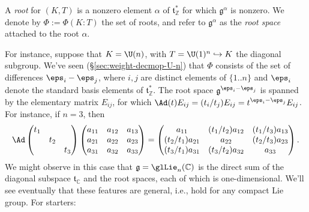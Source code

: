 \documentclass[reqno]{amsart} 
\begin{document}
\begin{definition}
  A \emph{root} for $(K,T)$ is a nonzero element $\alpha$ of $\mathfrak{t}_{\mathbb{Z}}^*$ for which $\mathfrak{g}^{\alpha}$ is nonzero.  We denote by $\Phi := \Phi(K:T)$ the set of roots, and refer to $\mathfrak{g}^{\alpha}$ as the \emph{root space} attached to the root $\alpha$.
\end{definition}

For instance, suppose that $K = \U(n)$, with $T = \U(1)^n \hookrightarrow K$ the diagonal subgroup.  We've seen (\S\ref{sec:weight-decmop-U-n}) that $\Phi$ consists of the set of differences $\eps_i - \eps_j$, where $i,j$ are distinct elements of $\{1..n\}$ and $\eps_i$ denote the standard basis elements of $\mathfrak{t}_{\mathbb{Z}}^*$.  The root space $\mathfrak{g}^{\eps_i-\eps_j}$ is spanned by the elementary matrix $E_{i j}$, for which $\Ad(t) E_{i j} = (t_i / t_j) E_{i j} = t^{\eps_i - \eps_j} E_{i j}$.  For instance, if $n = 3$, then
\begin{equation*}
  \Ad 
\begin{pmatrix}
    t_1 &  &  \\
    & t_2 &  \\
    & & t_3
  \end{pmatrix}
  \begin{pmatrix}
    a_{11} & a _{12} &  a _{13} \\
    a _{21} & a _{22} & a _{23} \\
    a _{31} & a _{32} & a _{33}
  \end{pmatrix}
  =
  \begin{pmatrix}
    a_{11} & (t_1/t_2) a _{12} &  (t_1/t_3)a _{13} \\
    (t_2/t_1) a _{21} & a _{22} & (t_2/t_3) a _{23} \\
    (t_3/t_1) a _{31} & (t_3/t_2) a _{32} & a _{33}
  \end{pmatrix}
.
\end{equation*}
We might observe in this case that $\mathfrak{g} = \glLie_n(\mathbb{C})$ is the direct sum of the diagonal subspace $\mathfrak{t}_{\mathbb{C}}$ and the root spaces, each of which is one-dimensional.  We'll see eventually that these features are general, i.e., hold for any compact Lie group.  For starters:
\end{document}
